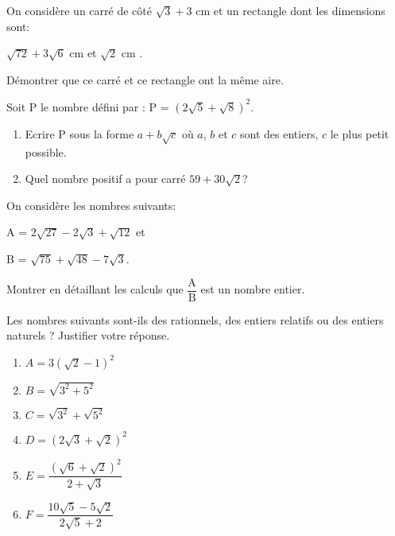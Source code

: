 
\begin{exercice}
On considère un carré de côté $\sqrt{3} + 3$ cm et un rectangle dont les  dimensions  sont:

$\sqrt{72}+ 3\sqrt{6}$ cm  et $\sqrt{2}$ cm .

Démontrer que ce carré et ce rectangle ont la même aire.
\end{exercice}

\begin{exercice}
Soit P le nombre défini par : P = $\left( 2 \sqrt{5}+\sqrt{8}\right) ^2$.
\begin{enumerate}
\item Ecrire P sous la forme $a+b\sqrt{c}$ où $a$, $b$ et $c$ sont des entiers, $c$ le plus petit possible.
\item Quel nombre positif a pour carré $59+30\sqrt{2}$?
\end{enumerate}
\end{exercice}

\begin{exercice}
On considère les nombres suivants:

A = $2\sqrt{27}-2\sqrt{3}+\sqrt{12}$ et 

B = $\sqrt{75}+\sqrt{48}-7\sqrt{3}$.

Montrer en détaillant les calculs que $\dfrac{\text{A}}{\text{B}}$ est un nombre entier.
\end{exercice}

\begin{exercice}
Les nombres suivants sont-ils des rationnels, des entiers relatifs ou des entiers naturels ? Justifier votre réponse.
\begin{multicols}{2}
\begin{enumerate}
\item $A=3\left( \sqrt{2}-1\right)^2 $
\item $B=\sqrt{3^2+5^2}$
\item $C=\sqrt{3^2}+\sqrt{5^2}$
\item $D=\left( 2\sqrt{3}+\sqrt{2}\right) ^2$
\item $E=\displaystyle\dfrac{\left( \sqrt{6}+\sqrt{2}\right) ^2}{2+\sqrt{3}}$
\item $F=\displaystyle\dfrac{10\sqrt{5}-5\sqrt{2}}{2\sqrt{5}+2}$
\end{enumerate}
\end{multicols}
\end{exercice}

